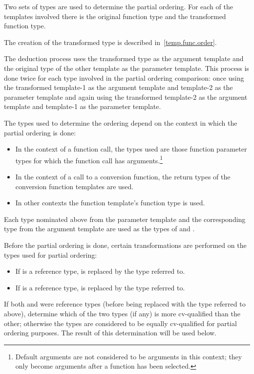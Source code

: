\pnum
Two sets of types are used to determine the partial ordering.  For each of
the templates involved there is the original function type and the
transformed function type.
\begin{note}
The creation of the transformed type is described in~\ref{temp.func.order}.
\end{note}
The deduction process uses the
transformed type as the argument template and the original type of the
other template as the parameter template.  This process is done twice
for each type involved in the partial ordering comparison: once using
the transformed template-1 as the argument template and template-2 as
the parameter template and again using the transformed template-2 as
the argument template and template-1 as the parameter template.

\pnum
The types used to determine the ordering depend on the context in which
the partial ordering is done:

\begin{itemize}
\item
In the context of a function call, the types used are those function parameter types
for which the function call has arguments.\footnote{Default arguments
are not considered to be arguments in this context; they only become arguments
after a function has been selected.}
\item
In the context of a call to a conversion function, the return types of
the conversion function templates are used.
\item
In other contexts the function template's function
type is used.
\end{itemize}

\pnum
Each type nominated above from the parameter template and the corresponding type from the
argument template are used as the types of
and
.

\pnum
Before the partial ordering is done, certain transformations are performed
on the types used for partial ordering:

\begin{itemize}
\item
If
is a reference type,
is replaced by the type referred to.
\item
If
is a reference type,
is replaced by the type referred to.
\end{itemize}

\pnum
If both
and
were reference types (before being replaced with the type referred to
above), determine which of the two types (if any) is more cv-qualified
than the other; otherwise the types are considered to be equally
cv-qualified for partial ordering purposes. The result of this
determination will be used below.

